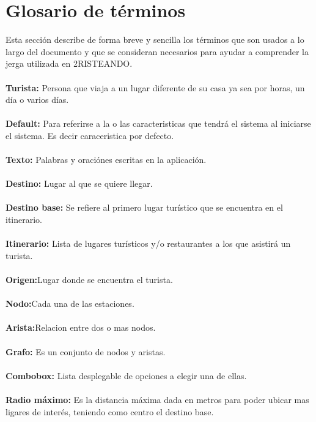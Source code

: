 \section{Glosario de t\'erminos}
Esta secci\'on describe de forma breve y sencilla los t\'erminos que son usados a lo largo del documento
y que se consideran necesarios para ayudar a comprender la jerga utilizada en 2RISTEANDO.
\\
\\
\textbf{Turista:} Persona que viaja a un lugar diferente de su casa ya sea por horas, un d\'ia o varios d\'ias.
\\
\\
\textbf{Default:} Para referirse a la o las caracteristicas que tendr\'a el sistema al iniciarse el sistema. Es decir caraceristica por defecto.
\\
\\
\textbf{Texto:} Palabras y oraci\'ones escritas en la aplicaci\'on.
\\
\\
\textbf{Destino:} Lugar al que se quiere llegar.
\\
\\
\textbf{Destino base:} Se refiere al primero lugar tur\'istico que se encuentra en el itinerario.
\\
\\
\textbf{Itinerario:} Lista de lugares tur\'isticos y/o restaurantes a los que asistir\'a un turista.
\\
\\
\textbf{Origen:}Lugar donde se encuentra el turista.
\\
\\
\textbf{Nodo:}Cada una de las estaciones.
\\
\\
\textbf{Arista:}Relacion entre dos o mas nodos.
\\
\\
\textbf{Grafo:} Es un conjunto de nodos y aristas.
\\
\\
\textbf{Combobox:} Lista desplegable de opciones a elegir una de ellas.
\\
\\
\textbf{Radio m\'aximo:} Es la distancia m\'axima dada en metros para poder ubicar mas ligares de inter\'es,
teniendo como centro el destino base.